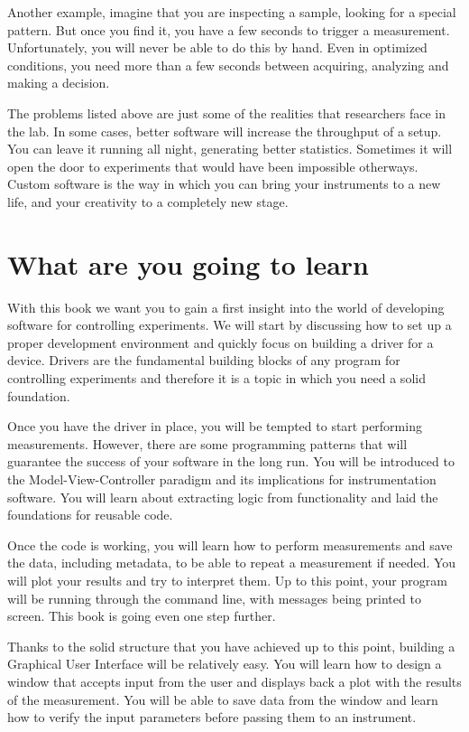 Another example, imagine that you are inspecting a sample, looking for a special pattern. But once you find it, you have a few seconds to trigger a measurement. Unfortunately, you will never be able to do this by hand. Even in optimized conditions, you need more than a few seconds between acquiring, analyzing and making a decision. 

The problems listed above are just some of the realities that researchers face in the lab. In some cases, better software will increase the throughput of a setup. You can leave it running all night, generating better statistics. Sometimes it will open the door to experiments that would have been impossible otherways. Custom software is the way in which you can bring your instruments to a new life, and your creativity to a completely new stage. 

\section{What are you going to learn}
With this book we want you to gain a first insight into the world of developing software for controlling experiments. We will start by discussing how to set up a proper development environment and quickly focus on building a driver for a device. Drivers are the fundamental building blocks of any program for controlling experiments and therefore it is a topic in which you need a solid foundation. 

Once you have the driver in place, you will be tempted to start performing measurements. However, there are some programming patterns that will guarantee the success of your software in the long run. You will be introduced to the Model-View-Controller paradigm and its implications for instrumentation software. You will learn about extracting logic from functionality and laid the foundations for reusable code. 

Once the code is working, you will learn how to perform measurements and save the data, including metadata, to be able to repeat a measurement if needed. You will plot your results and try to interpret them. Up to this point, your program will be running through the command line, with messages being printed to screen. This book is going even one step further. 

Thanks to the solid structure that you have achieved up to this point, building a Graphical User Interface will be relatively easy. You will learn how to design a window that accepts input from the user and displays back a plot with the results of the measurement. You will be able to save data from the window and learn how to verify the input parameters before passing them to an instrument. 

